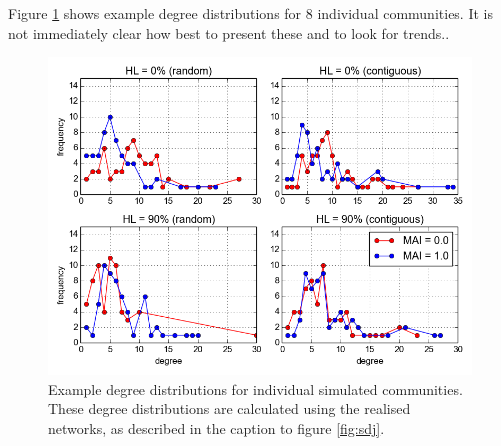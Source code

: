 Figure \ref{fig:example_dd} shows example degree distributions for 8 individual communities. It is not immediately clear how best to present these and to look for trends..

\begin{figure}

	\centering
	\includegraphics[width=\textwidth]{"example_degree_distribution"}
	\caption{Example degree distributions for individual simulated communities. These degree distributions are calculated using the realised networks, as described in the caption to figure \ref{fig:sdj}.}
	\label{fig:example_dd}
\end{figure}